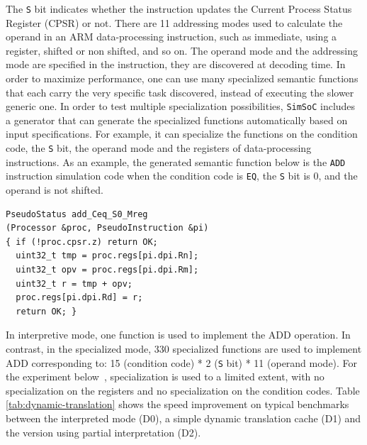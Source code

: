 \documentclass{llncs}
\newcommand{\simsoc}{\texttt{SimSoC}\xspace}
\begin{document}
The {\tt S} bit indicates whether the instruction updates the Current
Process Status Register (CPSR) or not. There are 11 addressing modes
used to calculate the operand in an ARM data-processing instruction,
such as immediate, using a register, shifted or non shifted, and so
on. The operand mode and the addressing mode are specified in the
instruction, they are discovered at decoding time. In order to
maximize performance, one can use many specialized semantic functions
that each carry the very specific task discovered, instead of
executing the slower generic one. In order to test multiple
specialization possibilities, \simsoc includes a generator that can
generate the specialized functions automatically based on input
specifications. For example, it can specialize the functions on the
condition code, the {\tt S} bit, the operand mode and the registers of
data-processing instructions. As an example, the generated semantic
function below is the {\tt ADD} instruction simulation code when the
condition code is {\tt EQ}, the {\tt S} bit is 0, and the operand is
not shifted.
\begin{verbatim}
PseudoStatus add_Ceq_S0_Mreg
(Processor &proc, PseudoInstruction &pi)
{ if (!proc.cpsr.z) return OK;
  uint32_t tmp = proc.regs[pi.dpi.Rn];
  uint32_t opv = proc.regs[pi.dpi.Rm];
  uint32_t r = tmp + opv;
  proc.regs[pi.dpi.Rd] = r;
  return OK; }
\end{verbatim}

In interpretive mode, one function is used to implement the ADD
operation.  In contrast, in the specialized mode, 330 specialized
functions are used to implement ADD corresponding to: 15 (condition
code) * 2 ({\tt S} bit) * 11 (operand mode).  For the experiment
below~\cite{simsoc-csee2008}, specialization is used to a limited
extent, with no specialization on the registers and no specialization
on the condition codes. Table \ref{tab:dynamic-translation} shows the
speed improvement on typical benchmarks between the interpreted mode
(D0), a simple dynamic translation cache (D1) and the version using
partial interpretation (D2).
\end{document}
